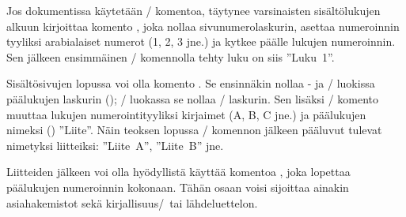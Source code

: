 Jos dokumentissa käytetään \-/ komentoa, täytynee
varsinaisten sisältölukujen alkuun kirjoittaa komento
, joka nollaa sivunumerolaskurin, asettaa
numeroinnin tyyliksi arabialaiset numerot (1, 2, 3 jne.) ja kytkee
päälle lukujen numeroinnin. Sen jälkeen ensimmäinen \-/
komennolla tehty luku on siis ''Luku~1''.

Sisältösivujen lopussa voi olla komento . Se
ensinnäkin nollaa - ja \-/ luokissa
päälukujen laskurin (); \-/ luokassa se
nollaa \-/ laskurin. Sen lisäksi \-/
komento muuttaa lukujen numerointityyliksi kirjaimet (A, B, C jne.) ja
päälukujen nimeksi () ''Liite''. Näin teoksen
lopussa \-/ komennon jälkeen pääluvut tulevat
nimetyksi liitteiksi: ''Liite~A'', ''Liite~B'' jne.

Liitteiden jälkeen voi olla hyödyllistä käyttää komentoa
, joka lopettaa päälukujen numeroinnin kokonaan.
Tähän osaan voisi sijoittaa ainakin asiahakemistot sekä kirjallisuus\-/\
tai lähdeluettelon.

